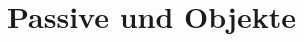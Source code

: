 \documentclass[handout,aspectratio=1610,dvipsnames]{beamer}
\begin{document}
  \section[Passive\slash Objekte]{Passive und Objekte}
  \let\woopsi\section\let\section\subsection\let\subsection\subsubsection
  
  \let\subsection\section\let\section\woopsi
\end{document}
